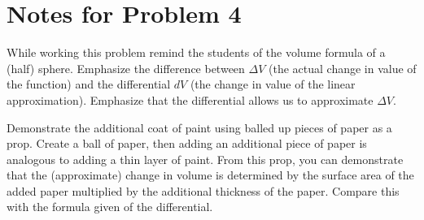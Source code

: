 \documentclass[handout,nooutcomes]{ximera}
\begin{document}
\section{Notes for Problem 4}
While working this problem remind the students of the volume formula of a (half) sphere.
Emphasize the difference between $\Delta V$ (the actual change in value of the function) and the differential $dV$ (the change in value of the linear approximation).
Emphasize that the differential allows us to approximate $\Delta V$.

Demonstrate the additional coat of paint using balled up pieces of paper as a prop.
Create a ball of paper, then adding an additional piece of paper is analogous to adding a thin layer of paint.
From this prop, you can demonstrate that the (approximate) change in volume is determined by the surface area of the added paper multiplied by the additional thickness of the paper.
Compare this with the formula given of the differential.


\end{document}
